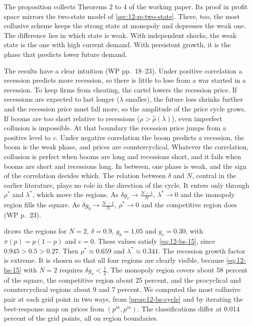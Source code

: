 The proposition collects Theorems 2 to 4 of the working paper. Its proof in profit space mirrors the two-state model
of \cref{sec:12-rs-two-state}. There, too, the most collusive scheme keeps the strong state at monopoly and depresses
the weak one. The difference lies in which state is weak. With independent shocks, the weak state is the one with high
current demand. With persistent growth, it is the phase that predicts lower future demand.

The results have a clear intuition (WP pp.~18--23). Under positive correlation a recession predicts more recession, so
there is little to lose from a war started in a recession. To keep firms from cheating, the cartel lowers the recession
price. If recessions are expected to last longer ($\lambda$ smaller), the future loss shrinks further and the recession price
must fall more, so the amplitude of the price cycle grows. If booms are too short relative to recessions
($\rho > \hat\rho(\lambda)$), even imperfect collusion is impossible. At that boundary the recession price jumps from a positive
level to $c$. Under negative correlation the boom predicts a recession, the boom is the weak phase, and prices are
countercyclical. Whatever the correlation, collusion is perfect when booms are long and recessions short, and it fails
when booms are short and recessions long. In between, one phase is weak, and the sign of the correlation decides which.
The relation between $\delta$ and $N$, central in the earlier literature, plays no role in the direction of the cycle. It
enters only through $\rho^*$ and $\lambda^*$, which move the regions. As $\delta g_r \to \frac{N-1}{N}$, $\lambda^* \to 0$ and the
monopoly region fills the square. As $\delta g_b \to \frac{N-1}{N}$, $\rho^* \to 0$ and the competitive region does (WP p.~23).

 draws the regions for $N = 2$, $\delta = 0.9$, $g_b = 1.05$ and $g_r = 0.30$, with $\pi(p) = p(1-p)$ and
$c = 0$. These values satisfy \eqref{eq:12-bs-15}, since $0.945 > 0.5 > 0.27$. Then $\rho^* \approx 0.659$ and
$\lambda^* \approx 0.341$. The recession growth factor is extreme. It is chosen so that all four regions are clearly visible,
because \eqref{eq:12-bs-15} with $N = 2$ requires $\delta g_r < \frac{1}{2}$. The monopoly region covers about 58 percent of
the square, the competitive region about 25 percent, and the procyclical and countercyclical regions about 9 and 7
percent. We computed the most collusive pair at each grid point in two ways, from \cref{prop:12-bs-cycle} and by
iterating the best-response map on prices from $(p^m, p^m)$. The classifications differ at 0.014 percent of the grid
points, all on region boundaries.

